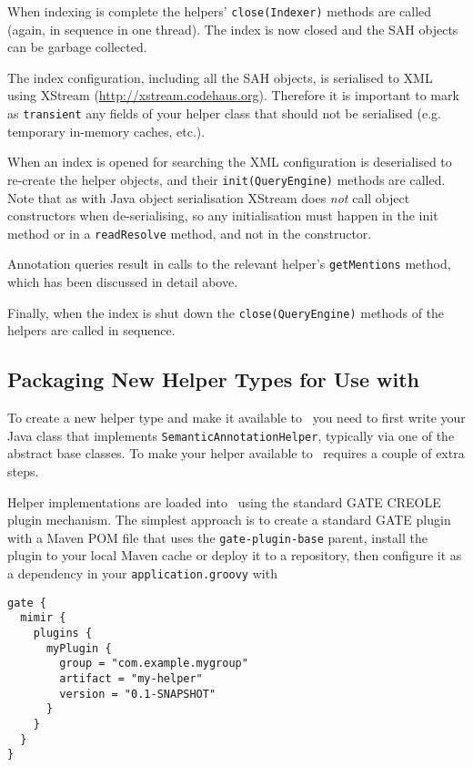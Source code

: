 When indexing is complete the helpers' {\tt close(Indexer)} methods are called
(again, in sequence in one thread).  The index is now closed and the SAH
objects can be garbage collected.

The index configuration, including all the SAH objects, is serialised to XML
using XStream (\url{http://xstream.codehaus.org}). Therefore it is important to
mark as \lstinline!transient! any fields of your helper class that should not be
serialised (e.g. temporary in-memory caches, etc.).

When an index is opened for searching the XML configuration is deserialised to
re-create the helper objects, and their {\tt init(QueryEngine)} methods are
called.  Note that as with Java object serialisation XStream does {\em not}
call object constructors when de-serialising, so any initialisation must happen
in the init method or in a {\tt readResolve} method, and not in the
constructor.

Annotation queries result in calls to the relevant helper's {\tt getMentions}
method, which has been discussed in detail above.

Finally, when the index is shut down the {\tt close(QueryEngine)} methods of
the helpers are called in sequence.

\subsection{Packaging New Helper Types for Use with \Mimir}
\label{sec:extend-package-plugins}

To create a new helper type and make it available to \Mimir\ you need to first
write your Java class that implements {\tt SemanticAnnotationHelper}, typically
via one of the abstract base classes.  To make your helper available to \Mimir\
requires a couple of extra steps.

Helper implementations are loaded into \Mimir\ using the standard GATE CREOLE
plugin mechanism.  The simplest approach is to create a standard GATE plugin
with a Maven POM file that uses the {\tt gate-plugin-base} parent, install
the plugin to your local Maven cache or deploy it to a repository, then
configure it as a dependency in your {\tt application.groovy} with
\begin{lstlisting}
gate {
  mimir {
    plugins {
      myPlugin {
        group = "com.example.mygroup"
        artifact = "my-helper"
        version = "0.1-SNAPSHOT"
      }
    }
  }
}
\end{lstlisting}

